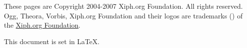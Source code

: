 \documentclass[9pt,letterpaper]{book}
\numberwithin{equation}{chapter}
\numberwithin{figure}{chapter}
\numberwithin{table}{chapter}
\begin{document}
These pages are Copyright \textcopyright{} 2004-2007 Xiph.org Foundation.
All rights reserved.
Ogg, Theora, Vorbis, Xiph.org Foundation and their logos are trademarks
 (\texttrademark) of the \href{http://www.xiph.org}{Xiph.org Foundation}.

This document is set in \LaTeX.



\cleardoublepage

\end{document}
